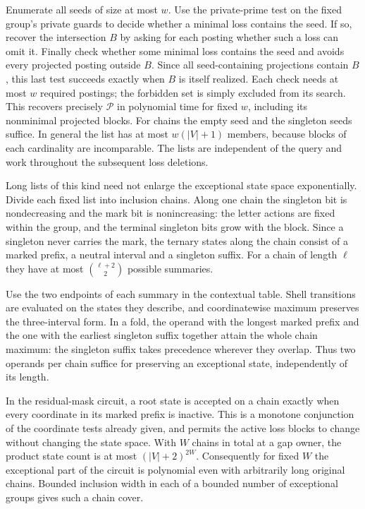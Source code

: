 Enumerate all seeds of size at most $w$. Use the
private-prime test on the fixed group's private
guards to decide whether a minimal loss contains
the seed. If so, recover the intersection $B$
by asking for each posting whether such a loss
can omit it. Finally check whether some minimal
loss contains the seed and avoids every projected
posting outside $B$. Since all seed-containing
projections contain $B$, this last test succeeds
exactly when $B$ is itself realized. Each check
needs at most $w$ required postings; the forbidden
set is simply excluded from its search. This
recovers precisely $\mathcal P$ in polynomial
time for fixed $w$, including its nonminimal
projected blocks. For chains the empty seed and
the singleton seeds suffice. In general the list
has at most $w(|V|+1)$ members, because blocks
of each cardinality are incomparable. The lists
are independent of the query and work throughout
the subsequent loss deletions.

Long lists of this kind need not enlarge the
exceptional state space exponentially. Divide
each fixed list into inclusion chains. Along
one chain the singleton bit is nondecreasing
and the mark bit is nonincreasing: the letter
actions are fixed within the group, and the
terminal singleton bits grow with the block.
Since a singleton never carries the mark, the
ternary states along the chain consist of a marked
prefix, a neutral interval and a singleton suffix.
For a chain of length $\ell$ they have at most
$\binom{\ell+2}{2}$ possible summaries.

Use the two endpoints of each summary in the
contextual table. Shell transitions are evaluated
on the states they describe, and coordinatewise
maximum preserves the three-interval form.
In a fold, the operand with the longest marked
prefix and the one with the earliest singleton
suffix together attain the whole chain maximum:
the singleton suffix takes precedence wherever
they overlap. Thus two operands per chain suffice
for preserving an exceptional state, independently
of its length.

In the residual-mask circuit, a root state is
accepted on a chain exactly when every coordinate
in its marked prefix is inactive. This is a
monotone conjunction of the coordinate tests
already given, and permits the active loss blocks
to change without changing the state space.
With $W$ chains in total at a gap owner, the
product state count is at most $(|V|+2)^{2W}$.
Consequently for fixed $W$ the exceptional part
of the circuit is polynomial even with arbitrarily
long original chains. Bounded inclusion width
in each of a bounded number of exceptional
groups gives such a chain cover.

